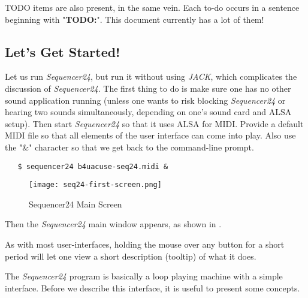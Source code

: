 \documentclass[
 11pt,
 twoside,
 a4paper,
 headinclude,
 footinclude,
 final                                 %
]{article}
\begin{document}
   TODO items
   are also present, in the same vein.
   Each to-do occurs in a sentence beginning with "\textbf{TODO:}".
   This document currently has a lot of them!

\subsection{Let's Get Started!}
\label{subsec:introduction_lets_get_started}

   Let us run \textsl{Sequencer24}, but run it without using \textsl{JACK},
   which complicates the discussion of \textsl{Sequencer24}.  The first
   thing to do is make sure one has no other sound application running
   (unless one wants to risk blocking \textsl{Sequencer24} or hearing two
    sounds simultaneously, depending on one's sound card and ALSA setup).
   Then start \textsl{Sequencer24} so that it uses ALSA for MIDI.  Provide a
   default MIDI file so that all elements of the user interface can come
   into play.  Also use the "\&" character so that we get back to the
   command-line prompt.


\begin{verbatim}
   $ sequencer24 b4uacuse-seq24.midi &
\end{verbatim}

\begin{figure}[H]
   \centering 
   \texttt{[image: seq24-first-screen.png]}
   \caption{Sequencer24 Main Screen}
   \label{fig:seq24_main_screen}
\end{figure}

   Then the \textsl{Sequencer24} main window appears, as shown in
   .

   As with most user-interfaces, holding the mouse over any button for a
   short period will let one view a short description (tooltip)
   of what it does.

   The \textsl{Sequencer24} program is basically a loop playing machine with a 
   simple interface.  Before we describe this interface, it is useful to
   present some concepts.







\end{document}
